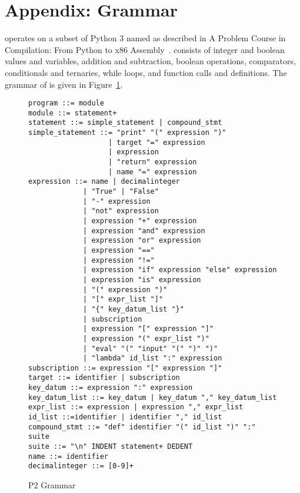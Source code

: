 \FloatBarrier
\section{Appendix: \ptwo{} Grammar} 
\label{sec:grammar}
\toolname operates on a subset of Python 3 named \ptwo{} as described in A Problem Course in Compilation: From Python to x86 Assembly~\cite{pythonbook}. \ptwo{} consists of integer and boolean values and variables, addition and subtraction, boolean operations, comparators, conditionals and ternaries, while loops, and function calls and definitions. The grammar of \ptwo{} is given in Figure~\ref{fig:grammar}.

\begin{figure}
\label{fig:grammar}
\begin{lstlisting}
program ::= module
module ::= statement+
statement ::= simple_statement | compound_stmt
simple_statement ::= "print" "(" expression ")"
                   | target "=" expression
                   | expression
                   | "return" expression
                   | name "=" expression
expression ::= name | decimalinteger
             | "True" | "False"
             | "-" expression
             | "not" expression
             | expression "+" expression
             | expression "and" expression
             | expression "or" expression
             | expression "=="
             | expression "!="
             | expression "if" expression "else" expression
             | expression "is" expression
             | "(" expression ")"
             | "[" expr_list "]"
             | "{" key_datum_list "}"
             | subscription
             | expression "[" expression "]"
             | expression "(" expr_list ")"
             | "eval" "(" "input" "(" ")" ")"
             | "lambda" id_list ":" expression
subscription ::= expression "[" expression "]"
target ::= identifier | subscription
key_datum ::= expression ":" expression
key_datum_list ::= key_datum | key_datum "," key_datum_list
expr_list ::= expression | expression "," expr_list
id_list ::=identifier | identifier "," id_list
compound_stmt ::= "def" identifier "(" id_list ")" ":" suite
suite ::= "\n" INDENT statement+ DEDENT
name ::= identifier
decimalinteger ::= [0-9]+
\end{lstlisting}
\caption{P2 Grammar}
\end{figure}